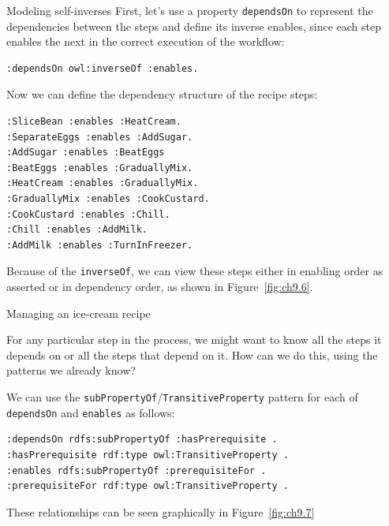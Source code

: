 \begin{challenge}{Modeling self-inverses}
First, let's use a property \texttt{dependsOn} to represent the dependencies
between the steps and define its inverse enables, since each step
enables the next in the correct execution of the workflow:

\begin{lstlisting}
:dependsOn owl:inverseOf :enables.
\end{lstlisting}

Now we can define the dependency structure of the recipe steps:

\begin{lstlisting}
:SliceBean :enables :HeatCream.
:SeparateEggs :enables :AddSugar.
:AddSugar :enables :BeatEggs
:BeatEggs :enables :GraduallyMix.
:HeatCream :enables :GraduallyMix.
:GraduallyMix :enables :CookCustard.
:CookCustard :enables :Chill.
:Chill :enables :AddMilk.
:AddMilk :enables :TurnInFreezer.
\end{lstlisting}

Because of the \texttt{inverseOf}, we can view these steps either in enabling
order as asserted or in dependency order, as shown in Figure~\ref{fig:ch9.6}.

\begin{challenge}{Managing an ice-cream recipe}

For any particular step in the process, we might want to know all the
steps it depends on or all the steps that depend on it. How can we do
this, using the patterns we already know?

\solution

We can use the \texttt{subPropertyOf}/\texttt{TransitiveProperty} pattern for each of
\texttt{dependsOn} and
\texttt{enables} as follows:

\begin{lstlisting}
:dependsOn rdfs:subPropertyOf :hasPrerequisite .
:hasPrerequisite rdf:type owl:TransitiveProperty .
:enables rdfs:subPropertyOf :prerequisiteFor .
:prerequisiteFor rdf:type owl:TransitiveProperty .
\end{lstlisting}

These relationships can be seen graphically in Figure~\ref{fig:ch9.7}


\end{challenge}
\end{challenge}
